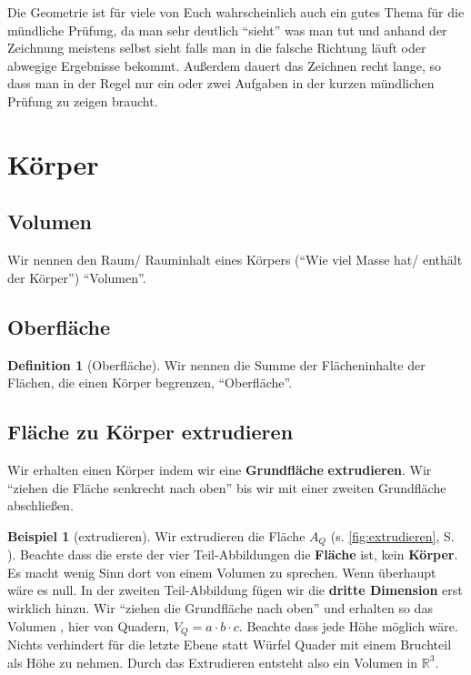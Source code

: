 \documentclass[a4paper]{book}%
\theoremstyle{definition}
\newtheorem{definition}{Definition}
\newtheorem{beispiel}{Beispiel}
\begin{document}
Die Geometrie ist für viele von Euch wahrscheinlich auch ein gutes Thema für die mündliche Prüfung, da man sehr deutlich \enquote{sieht} was man tut und anhand der Zeichnung meistens selbst sieht falls man in die falsche Richtung läuft oder abwegige Ergebnisse bekommt. Außerdem dauert das Zeichnen recht lange, so dass man in der Regel nur ein oder zwei Aufgaben in der kurzen mündlichen Prüfung zu zeigen braucht.






\section{Körper}

\subsection{Volumen}\label{Volumen}

Wir nennen den Raum/ Rauminhalt eines Körpers (\enquote{Wie viel Masse hat/ enthält der Körper}) \enquote{Volumen}.


\subsection{Oberfläche}\label{Oberfläche}

\begin{definition}[Oberfläche]
    Wir nennen die Summe der Flächeninhalte der Flächen, die einen Körper begrenzen, \enquote{Oberfläche}.
\end{definition}


\subsection{Fläche zu Körper extrudieren}\label{Extrudieren}

Wir erhalten einen Körper indem wir eine \textbf{Grundfläche} \textbf{extrudieren}. Wir \enquote{ziehen die Fläche senkrecht nach oben} bis wir mit einer zweiten Grundfläche abschließen.

\begin{beispiel}[extrudieren]
    Wir extrudieren die Fläche $A_Q$ (s. \ref{fig:extrudieren}, S. \pageref{fig:extrudieren}). Beachte dass die erste der vier Teil-Abbildungen die \textbf{Fläche} ist, kein \textbf{Körper}. Es macht wenig Sinn dort von einem Volumen zu sprechen. Wenn überhaupt wäre es null. In der zweiten Teil-Abbildung fügen wir die \textbf{dritte Dimension} erst wirklich hinzu. Wir \enquote{ziehen die Grundfläche nach oben} und erhalten so das Volumen , hier von Quadern, $V_Q = a \cdot b \cdot c$. Beachte dass jede Höhe möglich wäre. Nichts verhindert für die letzte Ebene statt Würfel Quader mit einem Bruchteil als Höhe zu nehmen. Durch das Extrudieren entsteht also ein Volumen in $\mathbb{R}^3$.
\end{beispiel}
\end{document}
